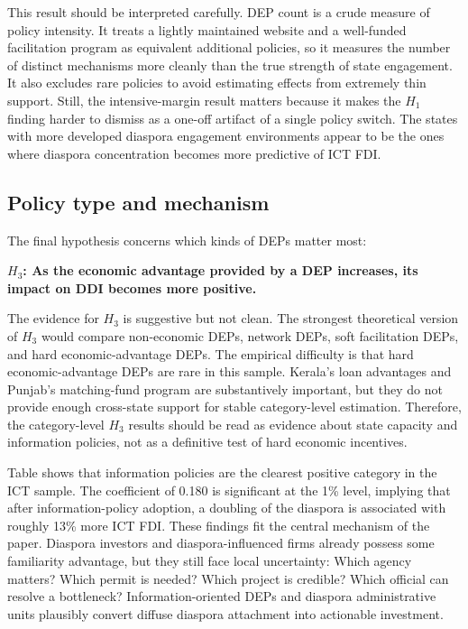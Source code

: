 \documentclass[12pt]{article}
\let\oldsubsection\subsection
\renewcommand{\subsection}{\FloatBarrier\oldsubsection}
\begin{document}
This result should be interpreted carefully. DEP count is a crude measure of policy intensity. It treats a lightly maintained website and a well-funded facilitation program as equivalent additional policies, so it measures the number of distinct mechanisms more cleanly than the true strength of state engagement. It also excludes rare policies to avoid estimating effects from extremely thin support. Still, the intensive-margin result matters because it makes the $H_1$ finding harder to dismiss as a one-off artifact of a single policy switch. The states with more developed diaspora engagement environments appear to be the ones where diaspora concentration becomes more predictive of ICT FDI.

\subsection{Policy type and mechanism}

The final hypothesis concerns which kinds of DEPs matter most:

\textbf{$H_3$: As the economic advantage provided by a DEP increases, its impact on DDI becomes more positive.}

The evidence for $H_3$ is suggestive but not clean. The strongest theoretical version of $H_3$ would compare non-economic DEPs, network DEPs, soft facilitation DEPs, and hard economic-advantage DEPs. The empirical difficulty is that hard economic-advantage DEPs are rare in this sample. Kerala's loan advantages and Punjab's matching-fund program are substantively important, but they do not provide enough cross-state support for stable category-level estimation. Therefore, the category-level $H_3$ results should be read as evidence about state capacity and information policies, not as a definitive test of hard economic incentives.

Table  shows that information policies are the clearest positive category in the ICT sample. The coefficient of 0.180 is significant at the 1\% level, implying that after information-policy adoption, a doubling of the diaspora is associated with roughly 13\% more ICT FDI. These findings fit the central mechanism of the paper. Diaspora investors and diaspora-influenced firms already possess some familiarity advantage, but they still face local uncertainty: Which agency matters? Which permit is needed? Which project is credible? Which official can resolve a bottleneck? Information-oriented DEPs and diaspora administrative units plausibly convert diffuse diaspora attachment into actionable investment.
\end{document}
